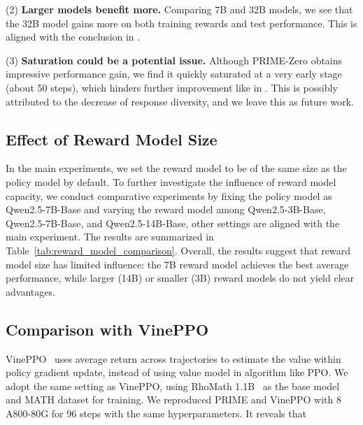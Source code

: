(2) \textbf{Larger models benefit more.} Comparing 7B and 32B models, we see that the 32B model gains more on both training rewards and test performance. This is aligned with the conclusion in \citet{deepseekai2025deepseekr1incentivizingreasoningcapability}.

(3) \textbf{Saturation could be a potential issue.} Although PRIME-Zero obtains impressive performance gain, we find it quickly saturated at a very early stage (about 50 steps), which hinders further improvement like in \citet{deepseekai2025deepseekr1incentivizingreasoningcapability}. This is possibly attributed to the decrease of response diversity, and we leave this as future work.

\subsection{Effect of Reward Model Size}
In the main experiments, we set the reward model to be of the same size as the policy model by default. To further investigate the influence of reward model capacity, we conduct comparative experiments by fixing the policy model as Qwen2.5-7B-Base and varying the reward model among Qwen2.5-3B-Base, Qwen2.5-7B-Base, and Qwen2.5-14B-Base, other settings are aligned with the main experiment. The results are summarized in Table~\ref{tab:reward_model_comparison}. Overall, the results suggest that reward model size has limited influence: the 7B reward model achieves the best average performance, while larger (14B) or smaller (3B) reward models do not yield clear advantages.



\subsection{Comparison with VinePPO}

VinePPO~\citep{kazemnejad2024vineppo} uses average return across trajectories to estimate the value within policy gradient update, instead of using value model in algorithm like PPO. 
We adopt the same setting as VinePPO, using RhoMath 1.1B~\citep{lin2024rho1} as the base model and MATH dataset for training. We reproduced PRIME and VinePPO with 8 A800-80G for 96 steps with the same hyperparameters. It reveals that 

